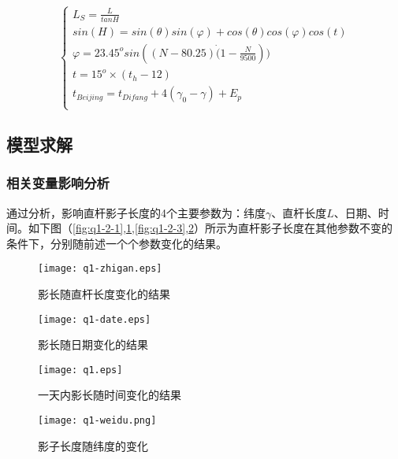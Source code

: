 \documentclass[withoutpreface,bwprint]{cumcmthesis} %
\begin{document}
\begin{equation}
\label{moxingyi}
\left\{  
  	\begin{array}{lr}  
  		L_S = \frac{L}{tan H} \\ 
  		sin(H) = sin(\theta)sin(\varphi)+cos(\theta)cos(\varphi)cos(t)\\
  		
  		\varphi = 23.45^osin((N-80.25)\dot(1-\frac{N}{9500}))	\\  
  		t = 15^o\times (t_h-12)\\
		t_{Beijing} = t_{Difang}+4(\gamma_0 - \gamma)+E_p\\
		    
	\end{array}  
\right.  
\end{equation}



\subsection{模型求解}

\subsubsection{相关变量影响分析}
通过分析，影响直杆影子长度的4个主要参数为：纬度$\gamma$、直杆长度$L$、日期、时间。如下图（\ref{fig:q1-2-1},\ref{fig:q1-2-2},\ref{fig:q1-2-3},\ref{fig:q1-2-4}）所示为直杆影子长度在其他参数不变的条件下，分别随前述一个个参数变化的结果。

\begin{figure}[!htbp]  
\begin{minipage}[t]{0.5\textwidth}
\centering  
\texttt{[image: q1-zhigan.eps]}
\caption{影长随直杆长度变化的结果} \label{fig:q1-2-1}\end{minipage}
\hspace{1ex}
\begin{minipage}[t]{0.5\textwidth}  
\centering  
\texttt{[image: q1-date.eps]}
\caption{影长随日期变化的结果} \label{fig:q1-2-2}
\end{minipage}  
\end{figure} 

\begin{figure}[!htbp]  
\begin{minipage}[t]{0.5\textwidth}
\centering  
\texttt{[image: q1.eps]}
\caption{一天内影长随时间变化的结果} \label{fig:q1-2-3}\end{minipage}
\hspace{1ex}
\begin{minipage}[t]{0.5\textwidth}  
\centering  
\texttt{[image: q1-weidu.png]}
\caption{影子长度随纬度的变化} \label{fig:q1-2-4}
\end{minipage}  
\end{figure} 
\end{document}
